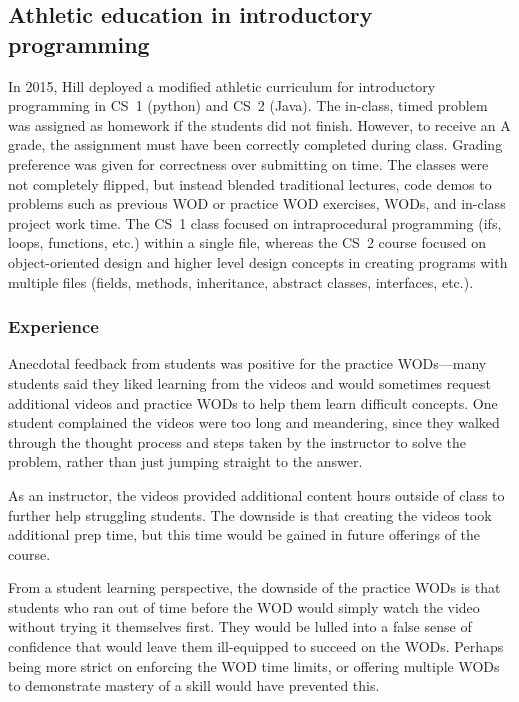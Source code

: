 \subsection{Athletic education in introductory programming}


In 2015, Hill deployed a modified athletic curriculum for introductory programming in CS~1 (python) and CS~2 (Java). The in-class, timed problem was assigned as homework if the students did not finish. However, to receive an A grade, the assignment must have been correctly completed during class. Grading preference was given for correctness over submitting on time.
%
The classes were not completely flipped, but instead blended traditional lectures, code demos to problems such as previous WOD or practice WOD exercises, WODs, and in-class project work time. The CS~1 class focused on intraprocedural programming (ifs, loops, functions, etc.) within a single file, whereas the CS~2 course focused on object-oriented design and higher level design concepts in creating programs with multiple files (fields, methods, inheritance, abstract classes, interfaces, etc.).

\subsubsection{Experience}

Anecdotal feedback from students was positive for the practice WODs---many students said they liked learning from the videos and would sometimes request additional videos and practice WODs to help them learn difficult concepts. One student complained the videos were too long and meandering, since they walked through the thought process and steps taken by the instructor to solve the problem, rather than just jumping straight to the answer.

As an instructor, the videos provided additional content hours outside of class to further help struggling students. The downside is that creating the videos took additional prep time, but this time would be gained in future offerings of the course.

From a student learning perspective, the downside of the practice WODs is that students who ran out of time before the WOD would simply watch the video without trying it themselves first. They would be lulled into a false sense of confidence that would leave them ill-equipped to succeed on the WODs. Perhaps being more strict on enforcing the WOD time limits, or offering multiple WODs to demonstrate mastery of a skill would have prevented this.

